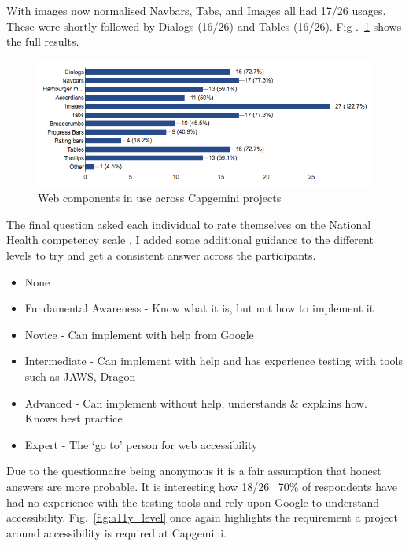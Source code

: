 With images now normalised Navbars, Tabs, and Images all had 17/26 usages.
These were shortly followed by Dialogs (16/26) and Tables (16/26). Fig
.~\ref{fig:components_in_use} shows the full results.

\begin{figure}[H]
\centering
\centering
\includegraphics[width=\textwidth]{figures/questions/components_in_use}
\captionsetup{justification=centering}
\caption{Web components in use across Capgemini projects
\label{fig:components_in_use}}
\end{figure}

The final question asked each individual to rate themselves on the National
Health competency scale \citep{NHComptency}. I added some additional guidance
to the different levels to try and get a consistent answer across the
participants.
\begin{itemize}
\item None
\item Fundamental Awareness - Know what it is, but not how to implement it
\item Novice - Can implement with help from Google
\item Intermediate - Can implement with help and has experience testing with tools such as JAWS, Dragon
\item Advanced  - Can implement without help, understands \& explains how.
Knows best practice
\item Expert - The `go to' person for web accessibility
\end{itemize}

Due to the questionnaire being anonymous it is a fair assumption that honest
answers are more probable. It is interesting how 18/26 ~70\% of respondents
have had no experience with the testing tools and rely upon Google to
understand accessibility. Fig.~\ref{fig:a11y_level} once again highlights
the requirement a project around accessibility is required at Capgemini.

